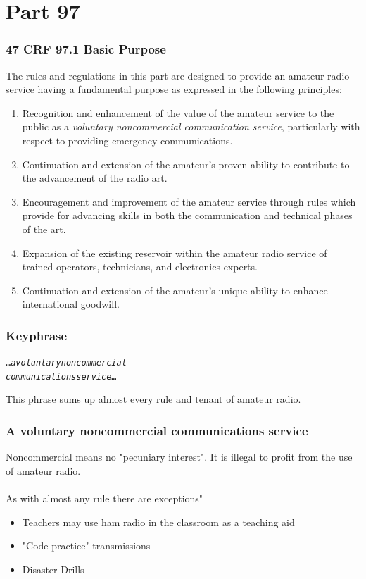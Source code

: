 \documentclass[10pt]{beamer}
\begin{document}
\section{Part 97}

\begin{frame}
\frametitle{47 CRF 97.1 Basic Purpose}
The rules and regulations in this part are designed to provide an amateur radio service having a fundamental purpose as expressed in the following principles:
\begin{enumerate}[A]
\scriptsize\item  Recognition and enhancement of the value of the amateur service to the public as a \emph{voluntary noncommercial communication service}, particularly with respect to providing emergency communications.\pause
\item Continuation and extension of the amateur's proven ability to contribute to the advancement of the radio art.\pause
\item Encouragement and improvement of the amateur service through rules which provide for advancing skills in both the communication and technical phases of the art.\pause
\item  Expansion of the existing reservoir within the amateur radio service of trained operators, technicians, and electronics experts. \pause
\item Continuation and extension of the amateur's unique ability to enhance international goodwill.
\end{enumerate}
\end{frame}

\begin{frame}
\frametitle{Keyphrase}
\begin{alltt}
\ldots\emph{a voluntary noncommercial\\communications service}\ldots
\end{alltt}
This phrase sums up almost every rule and tenant of amateur radio.
\end{frame}

\begin{frame}
\frametitle{A voluntary noncommercial communications service}
Noncommercial means no "pecuniary interest". It is illegal to profit from the use of amateur radio.\\
\hfil \\As with almost any rule there are exceptions"
\begin{itemize}
\item Teachers may use ham radio in the classroom as a teaching aid
\item "Code practice" transmissions
\item Disaster Drills
\end{itemize}
\end{frame}
\end{document}
